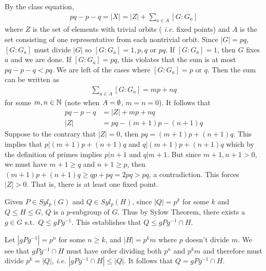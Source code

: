 \documentclass[12pt]{article}
\begin{document}
\begin{problem}[2]
By the class equation, 
\begin{align*}
	pq-p-q=|X| = |Z| + \sum_{ a \in A} [G:G_a]
\end{align*}
where $ Z$ is the set of elements with trivial orbits ( \emph{i.e.} fixed points) and $ A$ is the set consisting of one representative from each nontrivial orbit. Since  $ |G|=pq$,  $[G:G_a]$ must divide  $ |G|$ so  $ [G:G_a] =1, p,q$ or  $ pq$. If $ [G:G_a]=1$, then  $ G$ fixes  $ a$ and we are done. If  $ [G:G_a] =pq$, this violates that the sum is at most $ pq-p-q<pq$. We are left of the cases where  $ [G:G_a] = p$ or  $ q$.  Then the sum can be written as
\begin{align*}
	\sum_{a \in A} [G:G_a] = mp+nq
\end{align*}
for some $ m,n \in \mathbb{N}$ (note when $ A = \emptyset$, $ m=n=0$). It follows that
\begin{align*}
	pq-p-q &= |Z| + mp+nq \\
	|Z| &= pq-(m+1)p - (n+1)q
\end{align*}
Suppose to the contrary that $ |Z| = 0$, then  $ pq = (m+1)p+(n+1)q$. This implies that  $ p|(m+1)p+(n+1)q$ and  $ q|(m+1)p+(n+1)q$ which by the definition of primes implies  $ p|n+1$ and  $ q|m+1$. But since $ m+1,n+1>0$, we must have  $ m+1 \geq q$ and  $ n+1 \geq p$, then  $ (m+1)p+(n+1)q \geq qp+pq =2pq>pq$, a contradiction.  This forces $ |Z|>0$. That is, there is at least one fixed point.
\end{problem}

\begin{problem}[3]
Given $ P \in Syl_{ p}( G) $ and $ Q \in Syl_{ p}( H)$, since $ |Q|=p ^{k}$ for some $ k$ and  $ Q \leq H \leq G$, $ Q$ is a  $ p$-subgroup of  $ G$. Thus by Sylow Theorem, there exists a $ g \in G$ s.t.\ $ Q \leq gPg^{-1}$. This establishes that $ Q \leq gPg ^{-1} \cap H$. 

Let $ |gPg^{-1}| = p ^{n}$ for some $ n \geq k$, and $ |H|=p ^{k}m$ where $ p$ doesn't divide  $ m$. We see that $ gPg^{-1} \cap H$ must have order dividing both $ p ^{n}$ and $ p ^{k}m$ and therefore must divide $ p ^{k} = |Q|$, \emph{i.e.} $ |gPg^{-1} \cap H|\leq |Q|$. It follows that $ Q = gPg^{-1} \cap H$.
 
\end{problem}
\end{document}

